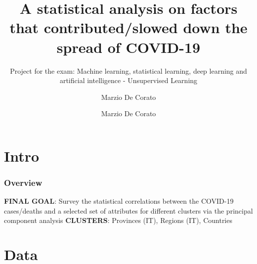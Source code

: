 \documentclass[compress]{beamer}
\author{Marzio De Corato}
\title[COVID-19 - Unsupervised Learning]{A statistical analysis on factors that contributed/slowed down the spread of COVID-19}
\author{}
\date{}
\subtitle{Project for the exam: Machine learning, statistical
learning, deep learning and artificial intelligence - Unsupervised Learning}
\begin{document}
\frame{\vspace{-2.5cm}\titlepage}

\usebackgroundtemplate{ } 

\author{Marzio De Corato}

\section{Intro}

\begin{frame}
\frametitle{Overview}
\textbf{FINAL GOAL}: Survey the statistical correlations between the COVID-19 cases/deaths and a selected set of attributes for different clusters via the principal component analysis 
\newline
\newline
\textbf{CLUSTERS}: Provinces (IT), Regions (IT), Countries

\end{frame}

\section{Data}
\end{document}
